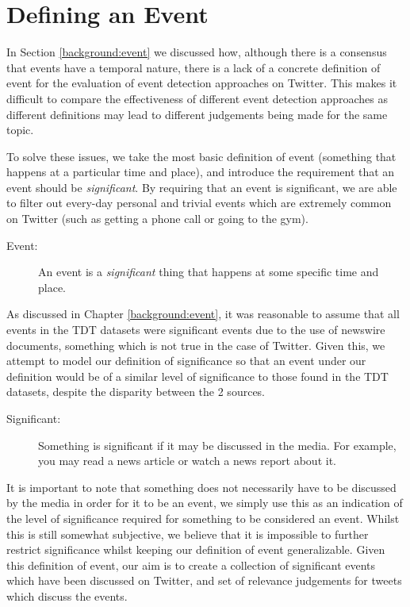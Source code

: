 
\section{Defining an Event}
\label{DefiningEvent}
In Section \ref{background:event} we discussed how, although there is a consensus that events have a temporal nature, there is a lack of a concrete definition of event for the evaluation of event detection approaches on Twitter.
This makes it difficult to compare the effectiveness of different event detection approaches as different definitions may lead to different judgements being made for the same topic.

To solve these issues, we take the most basic definition of event (something that happens at a particular time and place), and introduce the requirement that an event should be \textit{significant}.
By requiring that an event is significant, we are able to filter out every-day personal and trivial events which are extremely common on Twitter (such as getting a phone call or going to the gym).
\begin{description}
\item[Event:] An event is a \emph{significant} thing that happens at some specific time and place.
\end{description}
As discussed in Chapter \ref{background:event}, it was reasonable to assume that all events in the TDT datasets were significant events due to the use of newswire documents, something which is not true in the case of Twitter.
Given this, we attempt to model our definition of significance so that an event under our definition would be of a similar level of significance to those found in the TDT datasets, despite the disparity between the 2 sources.
\begin{description}
\item[Significant:] Something is significant if it may be discussed in the media. For example, you may read a news article or watch a news report about it.
\end{description}
It is important to note that something does not necessarily have to be discussed by the media in order for it to be an event, we simply use this as an indication of the level of significance required for something to be considered an event.
Whilst this is still somewhat subjective, we believe that it is impossible to further restrict significance whilst keeping our definition of event generalizable.
Given this definition of event, our aim is to create a collection of significant events which have been discussed on Twitter, and set of relevance judgements for tweets which discuss the events.

